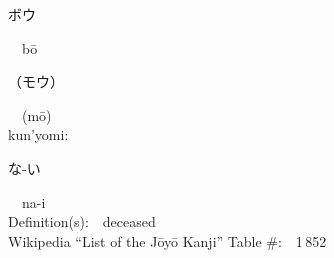 \begin{multicols}{2}
{\hspace*{2em}}{\begin{CJK}{UTF8}{min} ボウ \end{CJK}}\ \ b\=o\ \ \\
{\hspace*{2em}}{\begin{CJK}{UTF8}{min} （モウ） \end{CJK}}\ \ (m\=o)\ \ \\
{\hspace*{1em}}kun'yomi:\ \ \\
{\hspace*{2em}}{\begin{CJK}{UTF8}{min} な-い \end{CJK}}\ \ na-i\ \ \\
Definition(s):\ \ deceased \\
Wikipedia ``List of the J\=oy\=o Kanji'' Table \#:\ \ 1\,852 \\
\ \ \\
\end{multicols}



